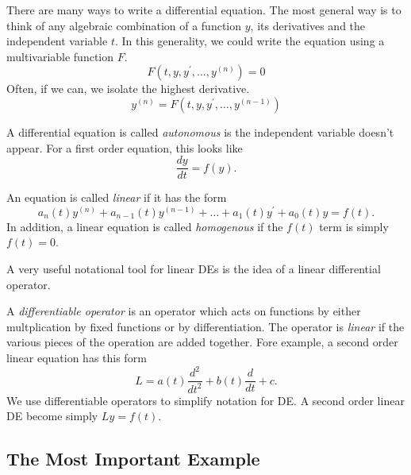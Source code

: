 \documentclass[fleqn,letterpaper]{report}
\begin{document}
There are many ways to write a differential equation. The
most general way is to think of any algebraic combination of a
function $y$, its derivatives and the independent variable
$t$. In this generality, we could write the equation using a
multivariable function $F$.
\begin{equation*}
F(t,y, y^\prime, \ldots, y^{(n)}) = 0
\end{equation*}
Often, if we can, we isolate the highest derivative.
\begin{equation*}
y^{(n)} = F(t,y,y^\prime, \ldots, y^{(n-1)}) 
\end{equation*}

\begin{defn}
A differential equation is called \emph{autonomous} is the independent
variable doesn't appear. For a first order equation, this
looks like
\begin{equation*}
\frac{dy}{dt} = f(y).
\end{equation*}
\end{defn}

\begin{defn}
An equation is called \emph{linear} if it has the form
\begin{equation*}
a_n(t)y^{(n)} + a_{n-1}(t)y^{(n-1)} + \ldots + a_1(t) y^\prime
+ a_0(t) y = f(t).
\end{equation*}
In addition, a linear equation is called \emph{homogenous} if
the $f(t)$ term is simply $f(t) = 0$. 
\end{defn}

A very useful notational tool for linear DEs is the
idea of a linear differential operator. 

\begin{defn}
\label{definition-linear-differential-operator}
A \emph{differentiable operator} is an operator which
acts on functions by either multplication by fixed functions
or by differentiation. The operator is \emph{linear} if the
various pieces of the operation are added together. Fore
example, a second order linear equation has this form 
\begin{equation*}
L = a(t) \frac{d^2}{dt^2} + b(t) \frac{d}{dt} + c.
\end{equation*}
We use differentiable operators to simplify notation for DE. A
second order linear DE become simply $Ly = f(t)$. 
\end{defn}

\subsection{The Most Important Example}
\label{important-example}
\end{document}
